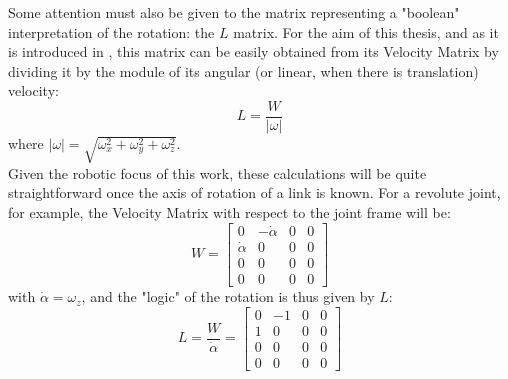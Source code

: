 \documentclass[a4paper,12pt,oneside]{report}
\begin{document}
Some attention must also be given to the matrix representing a "boolean" interpretation of the rotation: the $L$ matrix. For the aim of this thesis, and as it is introduced in \cite{ten}, this matrix can be easily obtained from its Velocity Matrix by dividing it by the module of its angular (or linear, when there is translation) velocity:
\begin{equation}
  L=\frac{W}{|\omega|}
  \label{L_matrix}
\end{equation}
where $|\omega|=\sqrt{\omega_x^2+\omega_y^2+\omega_z^2}$.\\
Given the robotic focus of this work, these calculations will be quite straightforward once the axis of rotation of a link is known. For a revolute joint, for example, the Velocity Matrix with respect to the joint frame will be:
\begin{equation}
  W=\begin{bmatrix}
    0&-\dot{\alpha}&0&0\\
    \dot{\alpha}&0&0&0\\
    0&0&0&0\\
    0&0&0&0
  \end{bmatrix}
\end{equation}
with $\dot{\alpha}=\omega_z$, and the "logic" of the rotation is thus given by $L$:
\begin{equation}
  L=\frac{W}{\dot{\alpha}}=\begin{bmatrix}
    0&-1&0&0\\
    1&0&0&0\\
    0&0&0&0\\
    0&0&0&0
  \end{bmatrix}
  \label{L_matrix}
\end{equation}
\newpage
\end{document}
